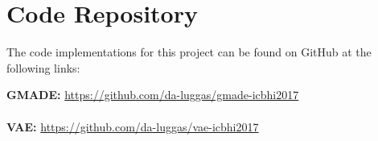 \cleardoubleoddpage%
\chapter{Code Repository}

The code implementations for this project can be found on GitHub at the following links:

\textbf{GMADE:} \href{https://github.com/da-luggas/gmade-icbhi2017}{https://github.com/da-luggas/gmade-icbhi2017} \\\\
\textbf{VAE:} \href{https://github.com/da-luggas/vae-icbhi2017}{https://github.com/da-luggas/vae-icbhi2017}

